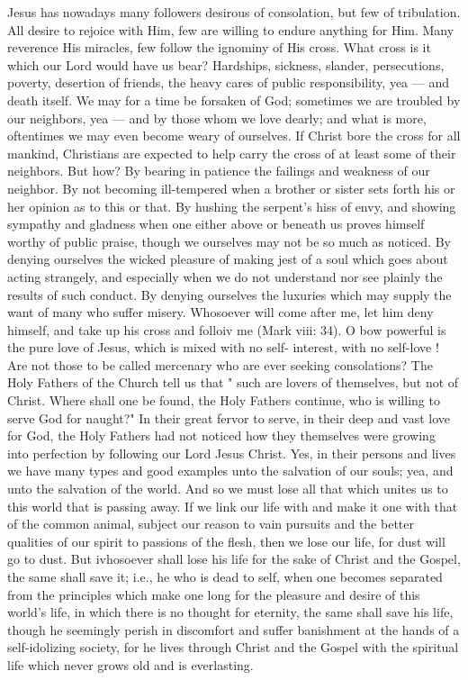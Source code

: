 Jesus has nowadays many followers desirous 
of consolation, but few of tribulation. All desire
to rejoice with Him, few are willing to 
endure anything for Him. Many reverence His
miracles, few follow the ignominy of His cross. 
What cross is it which our Lord would have 
us bear? Hardships, sickness, slander, persecutions,
poverty, desertion of friends, the heavy 
cares of public responsibility, yea — and death 
itself. We may for a time be forsaken of God; 
sometimes we are troubled by our neighbors, 
yea — and by those whom we love dearly; and 
what is more, oftentimes we may even become 
weary of ourselves. If Christ bore the cross 
for all mankind, Christians are expected to help 
carry the cross of at least some of their neighbors.
But how? By bearing in patience the 
failings and weakness of our neighbor. By not 
becoming ill-tempered when a brother or sister 
sets forth his or her opinion as to this or that. 
By hushing the serpent's hiss of envy, and 
showing sympathy and gladness when one either 
above or beneath us proves himself worthy of 
public praise, though we ourselves may not be 
so much as noticed. By denying ourselves the 
wicked pleasure of making jest of a soul which 
goes about acting strangely, and especially when 
we do not understand nor see plainly the results 
of such conduct. By denying ourselves the 
luxuries which may supply the want of many 
who suffer misery.
Whosoever will come after me, let him deny 
himself, and take up his cross and folloiv me 
(Mark viii: 34). O bow powerful is the pure 
love of Jesus, which is mixed with no self- 
interest, with no self-love ! Are not those to be 
called mercenary who are ever seeking consolations?
The Holy Fathers of the Church tell 
us that " such are lovers of themselves, but not 
of Christ. Where shall one be found, the Holy 
Fathers continue, who is willing to serve God 
for naught?" In their great fervor to serve, in 
their deep and vast love for God, the Holy 
Fathers had not noticed how they themselves 
were growing into perfection by following our 
Lord Jesus Christ. Yes, in their persons and 
lives we have many types and good examples 
unto the salvation of our souls; yea, and unto 
the salvation of the world. And so we must 
lose all that which unites us to this world that 
is passing away. If we link our life with and 
make it one with that of the common animal, 
subject our reason to vain pursuits and the better
qualities of our spirit to passions of the flesh, 
then we lose our life, for dust will go to dust. 
But ivhosoever shall lose his life for the sake 
of Christ and the Gospel, the same shall save it; 
i.e., he who is dead to self, when one becomes
separated from the principles which make one 
long for the pleasure and desire of this world's 
life, in which there is no thought for eternity, 
the same shall save his life, though he seemingly
perish in discomfort and suffer banishment
at the hands of a self-idolizing society, for 
he lives through Christ and the Gospel with the 
spiritual life which never grows old and is everlasting.

